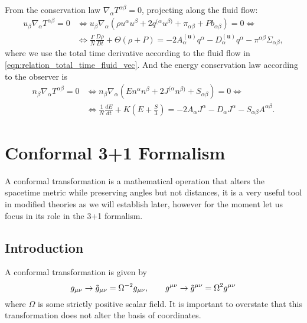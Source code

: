From the conservation law $\nabla_\alpha T^{\alpha\beta}=0$, projecting along the fluid flow:
\begin{align}
    u_\beta\nabla_\alpha T^{\alpha\beta}=0&\Leftrightarrow u_\beta\nabla_\alpha\left(\rho u^\alpha u^\beta + 2q^{(\alpha} u^{\beta)} +\pi_{\alpha\beta} + P b_{\alpha\beta}\right)=0\Leftrightarrow \nonumber\\
    &\Leftrightarrow \frac{\Gamma}{N}\frac{D\rho}{Dt} + \Theta(\rho+P)=  - 2A^{(\mathbf{u})}_\alpha q^\alpha - D^{(\mathbf{u})}_\alpha q^\alpha -\pi^{\alpha\beta}\Sigma_{\alpha\beta}
    \label{eqn:energy_conserv_law_fluid},
\end{align}
where we use the total time derivative according to the fluid flow in \cref{eqn:relation_total_time_fluid_vec}.
And the energy conservation law according to the observer is
\begin{align}
    n_\beta\nabla_\alpha T^{\alpha\beta}=0&\Leftrightarrow n_\beta\nabla_\alpha\left(E n^\alpha n^\beta + 2J^{(\alpha} n^{\beta)} +S_{\alpha\beta}\right)=0\Leftrightarrow \nonumber\\
    &\Leftrightarrow\frac{1}{N}\frac{dE}{dt} + K\left(E+\frac{S}{3}\right)=  - 2A_\alpha J^\alpha - D_\alpha J^\alpha -S_{\alpha\beta}A^{\alpha\beta}.
    \label{eqn:energy_conserv_law_normal}
\end{align}

\section{Conformal 3+1 Formalism}

A conformal transformation is a mathematical operation that alters the spacetime metric while preserving angles but not distances, it is a very useful tool in modified theories as we will establish later, however for the moment let us focus in its role in the 3+1 formalism.

\subsection{Introduction}

A conformal transformation is given by
\begin{equation}
    g_{\mu\nu}\rightarrow \Tilde{g}_{\mu\nu}=\Omega^{-2}g_{\mu\nu}, \qquad g^{\mu\nu}\rightarrow \Tilde{g}^{\mu\nu}=\Omega^{2}g^{\mu\nu}
    \label{eqn:def_conf_transf}
\end{equation}
where $\Omega$ is some strictly positive scalar field. It is important to overstate that this transformation does not alter the basis of coordinates. 

